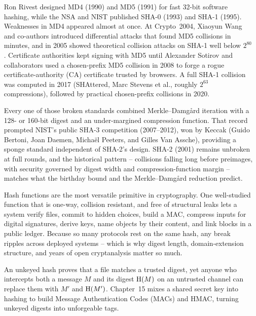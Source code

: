 \begin{historybox}
Ron Rivest designed MD4 (1990) and MD5 (1991) for fast 32-bit software hashing, while the NSA and NIST published SHA-0 (1993) and SHA-1 (1995). Weaknesses in MD4 appeared almost at once. At Crypto~2004, Xiaoyun Wang and co-authors introduced differential attacks that found MD5 collisions in minutes, and in 2005 showed theoretical collision attacks on SHA-1 well below $2^{80}$. Certificate authorities kept signing with MD5 until Alexander Sotirov and collaborators used a chosen-prefix MD5 collision in 2008 to forge a rogue certificate-authority (CA) certificate trusted by browsers. A full SHA-1 collision was computed in 2017 (SHAttered, Marc Stevens et al., roughly $2^{63}$ compressions), followed by practical chosen-prefix collisions in 2020.

Every one of those broken standards combined Merkle--Damg\aa{}rd iteration with a 128- or 160-bit digest and an under-margined compression function. That record prompted NIST's public SHA-3 competition (2007--2012), won by Keccak (Guido Bertoni, Joan Daemen, Micha\"el Peeters, and Gilles Van Assche), providing a sponge standard independent of SHA-2's design. SHA-2 (2001) remains unbroken at full rounds, and the historical pattern -- collisions falling long before preimages, with security governed by digest width and compression-function margin -- matches what the birthday bound and the Merkle--Damg\aa{}rd reduction predict.
\end{historybox}

\begin{aestheticbox}
Hash functions are the most versatile primitive in cryptography. One well-studied function that is one-way, collision resistant, and free of structural leaks lets a system verify files, commit to hidden choices, build a MAC, compress inputs for digital signatures, derive keys, name objects by their content, and link blocks in a public ledger. Because so many protocols rest on the same hash, any break ripples across deployed systems -- which is why digest length, domain-extension structure, and years of open cryptanalysis matter so much.
\end{aestheticbox}

\begin{connectionbox}
An unkeyed hash proves that a file matches a trusted digest, yet anyone who intercepts both a message $M$ and its digest $\operatorname{H}(M)$ on an untrusted channel can replace them with $M'$ and $\operatorname{H}(M')$. Chapter~15 mixes a shared secret key into hashing to build Message Authentication Codes (MACs) and HMAC, turning unkeyed digests into unforgeable tags.
\end{connectionbox}

